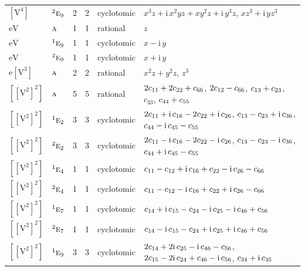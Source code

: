 \documentclass[10pt,a4paper]{article}
\numberwithin{equation}{section}
\newcommand{\irr}[1]{\text{\normalfont\scshape #1}}
\newcommand{\conjpair}[1]{{}^{#1}}
\newcommand{\iunit}{\mathrm{i}}
\newcommand{\jahn}[1]{\mathrm{#1}}
\newlength{\fillwidth}\newlength{\cellwidth}\newlength{\colwidth}
\newcommand{\signbreak}{\penalty100\relax}
\begin{document}
{\begin{longtable}{@{}llrrl>{\RaggedRight\arraybackslash}p{\fillwidth}@{}}
$\jahn{[V^{4}]}$ & $\conjpair{2}\irr{e}_{9}$ & 2 & 2 & cyclotomic & $x^{3}z + \iunit{}\,x^{2}yz + xy^{2}z + \iunit{}\,y^{3}z$, $xz^{3} + \iunit{}\,yz^{3}$\\
$\jahn{eV}$ & $\irr{a}$ & 1 & 1 & rational & $z$\\
$\jahn{eV}$ & $\conjpair{1}\irr{e}_{9}$ & 1 & 1 & cyclotomic & $x - \iunit{}\,y$\\
$\jahn{eV}$ & $\conjpair{2}\irr{e}_{9}$ & 1 & 1 & cyclotomic & $x + \iunit{}\,y$\\
$\jahn{e[V^{3}]}$ & $\irr{a}$ & 2 & 2 & rational & $x^{2}z + y^{2}z$, $z^{3}$\\
$\jahn{[[V^{2}]^{2}]}$ & $\irr{a}$ & 5 & 5 & rational & $2c_{11} +\signbreak 2c_{22} +\signbreak c_{66}$, $2c_{12} -\signbreak c_{66}$, $c_{13} +\signbreak c_{23}$, $c_{33}$, $c_{44} +\signbreak c_{55}$\\
$\jahn{[[V^{2}]^{2}]}$ & $\conjpair{1}\irr{e}_{2}$ & 3 & 3 & cyclotomic & $2c_{11} +\signbreak \iunit{}\,c_{16} -\signbreak 2c_{22} +\signbreak \iunit{}\,c_{26}$, $c_{13} -\signbreak c_{23} +\signbreak \iunit{}\,c_{36}$, $c_{44} -\signbreak \iunit{}\,c_{45} -\signbreak c_{55}$\\
$\jahn{[[V^{2}]^{2}]}$ & $\conjpair{2}\irr{e}_{2}$ & 3 & 3 & cyclotomic & $2c_{11} -\signbreak \iunit{}\,c_{16} -\signbreak 2c_{22} -\signbreak \iunit{}\,c_{26}$, $c_{13} -\signbreak c_{23} -\signbreak \iunit{}\,c_{36}$, $c_{44} +\signbreak \iunit{}\,c_{45} -\signbreak c_{55}$\\
$\jahn{[[V^{2}]^{2}]}$ & $\conjpair{1}\irr{e}_{4}$ & 1 & 1 & cyclotomic & $c_{11} -\signbreak c_{12} +\signbreak \iunit{}\,c_{16} +\signbreak c_{22} -\signbreak \iunit{}\,c_{26} -\signbreak c_{66}$\\
$\jahn{[[V^{2}]^{2}]}$ & $\conjpair{2}\irr{e}_{4}$ & 1 & 1 & cyclotomic & $c_{11} -\signbreak c_{12} -\signbreak \iunit{}\,c_{16} +\signbreak c_{22} +\signbreak \iunit{}\,c_{26} -\signbreak c_{66}$\\
$\jahn{[[V^{2}]^{2}]}$ & $\conjpair{1}\irr{e}_{7}$ & 1 & 1 & cyclotomic & $c_{14} +\signbreak \iunit{}\,c_{15} -\signbreak c_{24} -\signbreak \iunit{}\,c_{25} -\signbreak \iunit{}\,c_{46} +\signbreak c_{56}$\\
$\jahn{[[V^{2}]^{2}]}$ & $\conjpair{2}\irr{e}_{7}$ & 1 & 1 & cyclotomic & $c_{14} -\signbreak \iunit{}\,c_{15} -\signbreak c_{24} +\signbreak \iunit{}\,c_{25} +\signbreak \iunit{}\,c_{46} +\signbreak c_{56}$\\
$\jahn{[[V^{2}]^{2}]}$ & $\conjpair{1}\irr{e}_{9}$ & 3 & 3 & cyclotomic & $2c_{14} +\signbreak 2\iunit{}\,c_{25} -\signbreak \iunit{}\,c_{46} -\signbreak c_{56}$, $2c_{15} -\signbreak 2\iunit{}\,c_{24} +\signbreak c_{46} -\signbreak \iunit{}\,c_{56}$, $c_{34} +\signbreak \iunit{}\,c_{35}$\\

\end{longtable}}
\end{document}
